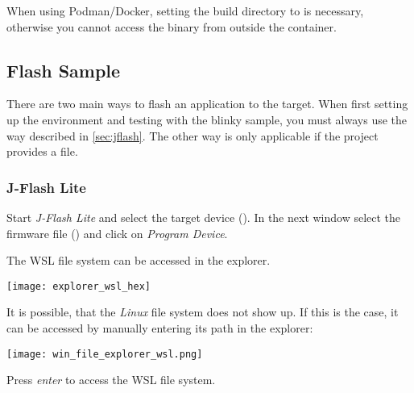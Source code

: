 \begin{infobox}
  When using Podman/Docker, setting the build directory to  is necessary, otherwise you cannot access the binary from outside the container.
\end{infobox}


\newpage

\subsection{Flash Sample}

There are two main ways to flash an application to the target.
When first setting up the environment and testing with the blinky sample, you must always use the way described in \autoref{sec:jflash}.
The other way is only applicable if the project provides a  file.

\subsubsection{J-Flash Lite}\label{sec:jflash}
Start \emph{J-Flash Lite} and select the target device (\texttt{\mcu}).
In the next window select the firmware file () and click on \emph{Program Device}.


\begin{infobox}
  The WSL file system can be accessed in the explorer.
  \begin{center}
    \texttt{[image: explorer\_wsl\_hex]}
  \end{center}

  It is possible, that the \emph{Linux} file system does not show up.
  If this is the case, it can be accessed by manually entering its path in the explorer:
  \mono{\\\\wsl\$}
  \begin{center}
    \texttt{[image: win\_file\_explorer\_wsl.png]}
  \end{center}
  Press \emph{enter} to access the WSL file system.
\end{infobox}

\newpage

